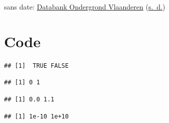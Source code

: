 \documentclass[twoside]{extreport}
\begin{document}
sans date:
\protect\hyperlink{ref-databank_ondergrond_vlaanderen_bepalen_nodate}{Databank
Ondergrond Vlaanderen}
(\protect\hyperlink{ref-databank_ondergrond_vlaanderen_bepalen_nodate}{s.~d.})

\hypertarget{code}{%
\chapter{Code}\label{code}}

\begin{Shaded}
\begin{Highlighting}[]
\NormalTok{(}\NormalTok{, }\NormalTok{)}
\end{Highlighting}
\end{Shaded}

\begin{verbatim}
## [1]  TRUE FALSE
\end{verbatim}

\begin{Shaded}
\begin{Highlighting}[]
\SpecialCharTok{:}
\end{Highlighting}
\end{Shaded}

\begin{verbatim}
## [1] 0 1
\end{verbatim}

\begin{Shaded}
\begin{Highlighting}[]
\NormalTok{(}\NormalTok{, }\NormalTok{)}
\end{Highlighting}
\end{Shaded}

\begin{verbatim}
## [1] 0.0 1.1
\end{verbatim}

\begin{Shaded}
\begin{Highlighting}[]
\NormalTok{(}\NormalTok{, }\NormalTok{)}
\end{Highlighting}
\end{Shaded}

\begin{verbatim}
## [1] 1e-10 1e+10
\end{verbatim}
\end{document}
